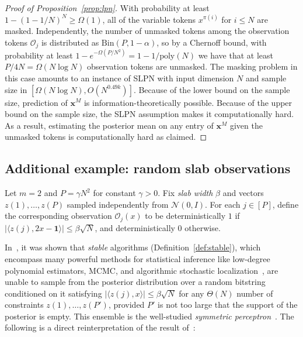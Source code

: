 \begin{proof}[Proof of Proposition~\ref{prop:lpn}]
    With probability at least $1 - (1 - 1/N)^N \ge \Omega(1)$, all of the variable tokens $x^{\pi(i)}$ for $i \le N$ are masked. Independently, the number of unmasked tokens among the observation tokens $\mathcal{O}_j$ is distributed as $\mathrm{Bin}(P, 1-\alpha)$, so by a Chernoff bound, with probability at least $1 - e^{-\Omega(P/N^2)} = 1 - 1/\mathrm{poly}(N)$ we have that at least $P/4N = \Omega(N\log N)$ observation tokens are unmasked. The masking problem in this case amounts to an instance of SLPN with input dimension $N$ and sample size in $[\Omega(N\log N), O(N^{0.49k})]$. Because of the lower bound on the sample size, prediction of $\mathbf{x}^M$ is information-theoretically possible. Because of the upper bound on the sample size, the SLPN assumption makes it computationally hard. As a result, estimating the posterior mean on any entry of $\mathbf{x}^M$ given the unmasked tokens is computationally hard as claimed.
\end{proof}

\subsection{Additional example: random slab observations}
\label{app:slab}

\begin{example}\label{example:perceptron}
    Let $m = 2$ and $P = \gamma N^2$ for constant $\gamma > 0$. Fix \emph{slab width} $\beta$ and vectors $z{(1)}, \ldots, z{(P)}$ sampled independently from $\mathcal{N}(0,I)$. For each $j\in[P]$, define the corresponding observation $\mathcal{O}_j(x)$ to be deterministically $1$ if $|\langle z{(j)}, 2x - \mathbf{1}\rangle| \le \beta\sqrt{N}$, and deterministically $0$ otherwise.
\end{example}

In~\cite{alaoui2024hardness}, it was shown that \emph{stable} algorithms (Definition~\ref{def:stable}), which encompass many powerful methods for statistical inference like low-degree polynomial estimators, MCMC, and algorithmic stochastic localization~\cite{gamarnik2021overlap}, are unable to sample from the posterior distribution over a random bitstring conditioned on it satisfying $|\langle z{(j)}, x\rangle| \le \beta\sqrt{N}$ for any $\Theta(N)$ number of constraints $z{(1)},\ldots,z{(P')}$, provided $P'$ is not too large that the support of the posterior is empty. This ensemble is the well-studied \emph{symmetric perceptron}~\cite{aubin2019storage}. The following is a direct reinterpretation of the result of~\cite{alaoui2024hardness}:

